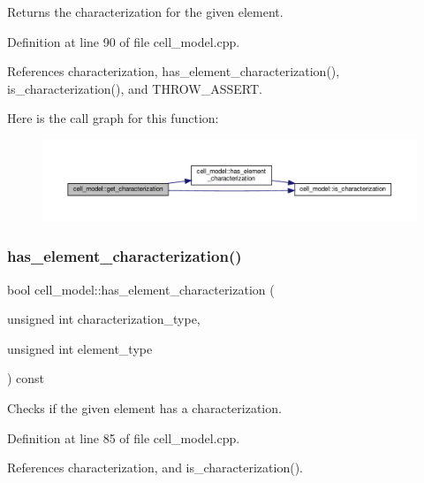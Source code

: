 Returns the characterization for the given element. 



Definition at line 90 of file cell\+\_\+model.\+cpp.



References characterization, has\+\_\+element\+\_\+characterization(), is\+\_\+characterization(), and T\+H\+R\+O\+W\+\_\+\+A\+S\+S\+E\+RT.

Here is the call graph for this function\+:
\nopagebreak
\begin{figure}[H]
\begin{center}
\leavevmode
\includegraphics[width=350pt]{d6/dcd/classcell__model_a538b317e7ed9feecb05c9714b935f4a1_cgraph}
\end{center}
\end{figure}
\mbox{\label{classcell__model_aa157ea9e89fee28a46ffcca9ebf2304a}} 
\subsubsection{\texorpdfstring{has\+\_\+element\+\_\+characterization()}{has\_element\_characterization()}}
{\footnotesize\ttfamily bool cell\+\_\+model\+::has\+\_\+element\+\_\+characterization (\begin{DoxyParamCaption}\item[{unsigned int}]{characterization\+\_\+type,  }\item[{unsigned int}]{element\+\_\+type }\end{DoxyParamCaption}) const}



Checks if the given element has a characterization. 



Definition at line 85 of file cell\+\_\+model.\+cpp.



References characterization, and is\+\_\+characterization().



